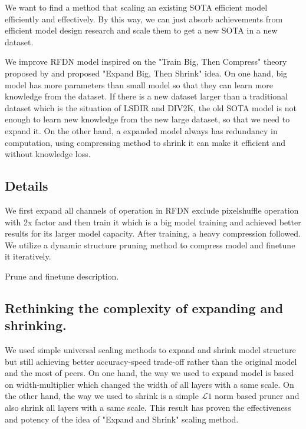 \documentclass[10pt,twocolumn,letterpaper]{article}
\begin{document}
We want to find a method that scaling an existing SOTA efficient model efficiently and effectively. By this way, we can just absorb achievements from efficient model design research and scale them to get a new SOTA in a new dataset.

We improve RFDN\cite{liu2020residual} model inspired on the "Train Big, Then Compress" theory proposed by \cite{li2020trainlarge} and proposed "Expand Big, Then Shrink" idea. On one hand, big model has more parameters than small model so that they can learn more knowledge from the dataset. If there is a new dataset larger than a traditional dataset which is the situation of LSDIR and DIV2K, the old SOTA model is not enough to learn new knowledge from the new large dataset, so that we need to expand it. On the other hand, a expanded model always has redundancy in computation, using compressing method to shrink it can make it efficient and without knowledge loss.

\subsection{Details}
We first expand all channels of operation in RFDN exclude pixelshuffle operation with 2x factor and then train it which is a big model training and achieved better results for its larger model capacity.
After training, a heavy compression followed.
We utilize a dynamic structure pruning method\cite{fang2023depgraph} to compress model and finetune it iteratively.

Prune and finetune description.

\subsection{Rethinking the complexity of expanding and shrinking.}

We used simple universal scaling methods\cite{tan2019efficientnet} to expand and shrink model structure but still achieving better accuracy-speed trade-off rather than the original model and the most of peers. On one hand, the way we used to expand model is based on width-multiplier which changed the width of all layers with a same scale. On the other hand, the way we used to shrink is a simple $\mathcal{L}1$ norm based pruner and also shrink all layers with a same scale. This result has proven the effectiveness and potency of the idea of "Expand and Shrink" scaling method.
\end{document}
